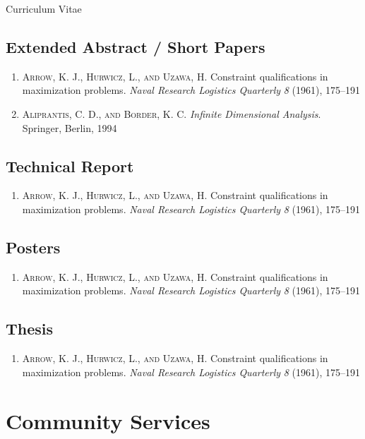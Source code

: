 \documentclass[11pt,a4paper]{article}
\makeatletter
\newcommand{\ArrowCitation}{%
    \textsc{Arrow, K. J., Hurwicz, L., and Uzawa, H\@.}
    Constraint qualifications in maximization problems.
    \emph{Naval Research Logistics Quarterly} \emph{8} (1961), 175--191%
}
\newcommand{\AliprantisCitation}{%
    \textsc{Aliprantis, C. D., and Border, K. C\@.}
    \emph{Infinite Dimensional Analysis}. Springer, Berlin, 1994%
}
\makeatother
\begin{document}
\begin{cv}{Curriculum Vitae}
\subsection{Extended Abstract / Short Papers}
\begin{cvlist}{}
    \item
        \begin{enumerate}[resume,leftmargin=-2cm]
            \item \ArrowCitation
            \item \AliprantisCitation
        \end{enumerate}
\end{cvlist}
\subsection{Technical Report}
\begin{cvlist}{}
    \item
        \begin{enumerate}[resume,leftmargin=-2cm]
            \item \ArrowCitation
        \end{enumerate}
\end{cvlist}
\subsection{Posters}
\begin{cvlist}{}
    \item
        \begin{enumerate}[resume,leftmargin=-2cm]
            \item \ArrowCitation
        \end{enumerate}
\end{cvlist}
\subsection{Thesis}
\begin{cvlist}{}
    \item
        \begin{enumerate}[resume,leftmargin=-2cm]
            \item \ArrowCitation
        \end{enumerate}
\end{cvlist}

\section{Community Services}

\end{cv}
\end{document}
